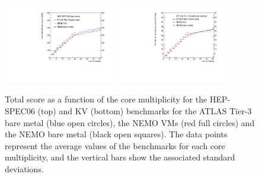 \begin{figure}[htbp]
\centering
\includegraphics[width=0.44\textwidth]{figures/benchmark-hepspec06-total.pdf}
\includegraphics[width=0.44\textwidth]{figures/kv-BFG-BM-NEMO-VM-NEMO-BM-total.pdf} 
\caption{Total score as a function of the core multiplicity for the HEP-SPEC06 (top) and KV (bottom) benchmarks for the ATLAS Tier-3 bare metal (blue open circles),
the NEMO VMs (red full circles) and the NEMO bare metal (black open squares). The data points represent the average values of the benchmarks for each core multiplicity,
and the vertical bars show the associated standard deviations.}
\label{bmk-total}
\end{figure}



%
%
